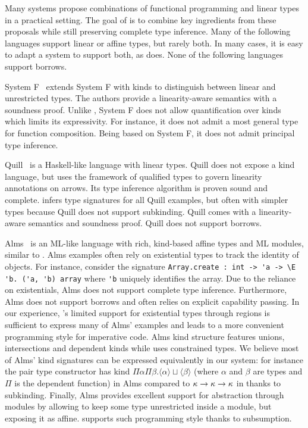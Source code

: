 Many systems propose combinations of
functional programming and linear types in a practical setting.
The goal of \lang is to combine key ingredients
from these proposals while still preserving
complete type inference.
Many of the following languages support linear or affine types, but rarely
both. In many cases, it is easy to adapt a system to support both, as
\lang does.
None of the following languages support borrows.


System F\degree~\citep{DBLP:conf/tldi/MazurakZZ10}
extends System F with kinds to distinguish
between linear and unrestricted types.
The authors provide
a linearity-aware semantics with a soundness proof.
Unlike \lang, System F\degree{} does not allow
quantification over kinds which limits its expressivity. For instance, it
does not admit a most general type for function composition.
Being based on System F, it does not admit
principal type inference.

Quill~\citep{DBLP:conf/icfp/Morris16} is a Haskell-like language with linear
types.
Quill does not expose a kind language, but
uses the framework of qualified types to govern linearity annotations on arrows.
Its type inference algorithm is proven sound and complete.
\lang infers type signatures for all Quill examples, but often with
simpler types because Quill does not support subkinding.
Quill comes with a linearity-aware semantics and soundness proof.
Quill does not support borrows.


Alms~\citep{DBLP:conf/popl/TovP11} is an ML-like language with rich, kind-based
affine types and ML modules, similar to \lang.
Alms examples often rely on existential types to track the identity
of objects. For instance, consider the signature
\lstinline/Array.create : int -> 'a -> \E 'b. ('a, 'b) array/ where
\lstinline/'b/ uniquely identifies the array.
Due to the reliance on existentials, Alms does not support complete type inference.
Furthermore, Alms does not support borrows and often relies
on explicit capability passing.
In our experience, \affe's limited support for existential types through
regions is sufficient to express many of Alms' examples and leads to
a more convenient programming style for imperative code.
%
Alms kind structure features unions, intersections and dependent kinds while
\lang uses constrained types.
We believe most of Alms' kind signatures can be expressed equivalently in
our system: for instance the pair type constructor
has kind $\Pi\alpha\Pi\beta. \langle\alpha\rangle \sqcup \langle\beta\rangle$
(where $\alpha$ and $\beta$ are types and $\Pi$ is the dependent function)
in Alms compared to $\kappa\to\kappa\to\kappa$ in \lang thanks
to subkinding.
%
Finally, Alms provides excellent support for abstraction through
modules by allowing to keep some type unrestricted inside a module, but
exposing it as affine. \lang supports
such programming style thanks to subsumption.

